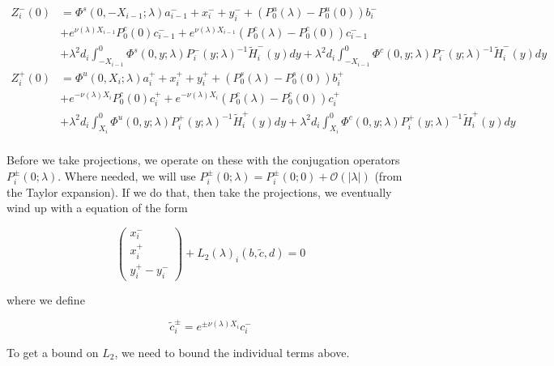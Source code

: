 \documentclass[12pt]{article}
\begin{document}
\begin{align*}
Z_i^-(0) &= \Phi^s(0, -X_{i-1}; \lambda) a_{i-1}^- + x_i^- + y_i^- + (P_0^u(\lambda) - P_0^u(0))b_i^- \\
&+ e^{\nu(\lambda) X_{i-1}} P_0^c(0) c_{i-1}^- + e^{\nu(\lambda) X_{i-1}} (P_0^c(\lambda) - P_0^c(0))c_{i-1}^- \\
&+ \lambda^2 d_i \int_{-X_{i-1}}^0 \Phi^s(0, y; \lambda) P_i^-(y; \lambda)^{-1} \tilde{H}_i^-(y) dy 
+ \lambda^2 d_i \int_{-X_{i-1}}^0 \Phi^c(0, y; \lambda) P_i^-(y; \lambda)^{-1} \tilde{H}_i^-(y) dy  \\ 
Z_i^+(0) &= \Phi^u(0, X_i; \lambda) a_i^+ + x_i^+ + y_i^+ + (P_0^s(\lambda) - P_0^s(0)) b_i^+ \\
&+ e^{-\nu(\lambda)X_i} P_0^c(0) c_i^+ + e^{-\nu(\lambda)X_i} (P_0^c(\lambda) - P_0^c(0))c_i^+ \\
&+ \lambda^2 d_i \int_{X_i}^0 \Phi^u(0, y; \lambda) P_i^+(y; \lambda)^{-1} \tilde{H}_i^+(y) dy 
+ \lambda^2 d_i \int_{X_i}^0 \Phi^c(0, y; \lambda) P_i^+(y; \lambda)^{-1} \tilde{H}_i^+(y) dy \\
\end{align*}
 
Before we take projections, we operate on these with the conjugation operators $P_i^\pm(0; \lambda)$. Where needed, we will use $P_i^\pm(0; \lambda) = P_i^\pm(0; 0) + \mathcal{O}(|\lambda|)$ (from the Taylor expansion). If we do that, then take the projections, we eventually wind up with a equation of the form

\[
\begin{pmatrix}x_i^- \\ x_i^+ \\ 
y_i^+ - y_i^- \end{pmatrix} + L_2(\lambda)_i(b, \tilde{c}, d) = 0
\]

where we define

\begin{equation}\label{tildec}
\tilde{c}_i^\pm = e^{\pm \nu(\lambda) X_i} c_i^-
\end{equation}

To get a bound on $L_2$, we need to bound the individual terms above.
\end{document}
